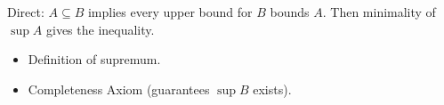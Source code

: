 \begin{remark*}
Direct: $A \subseteq B$ implies every upper bound for $B$ bounds $A$.
Then minimality of $\sup A$ gives the inequality.
\end{remark*}

\begin{remark*}[Dependencies]
\begin{itemize}
  \item Definition of supremum.
  \item Completeness Axiom (guarantees $\sup B$ exists).
\end{itemize}
\end{remark*}
